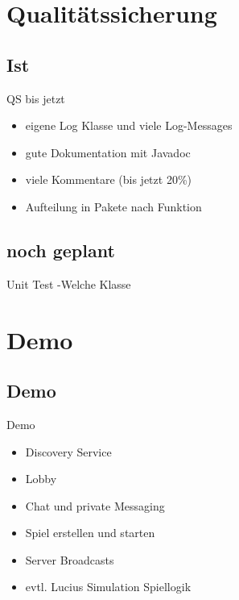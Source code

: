 \documentclass[12pt, utf8]{beamer}
\begin{document}
\section{Qualitätssicherung}
\subsection{Ist}
\begin{frame}{QS bis jetzt}
\begin{itemize}
\item eigene Log Klasse und viele Log-Messages
\item gute Dokumentation mit Javadoc
\item viele Kommentare (bis jetzt 20\%)
\item Aufteilung in Pakete nach Funktion
\end{itemize}
\end{frame}

\subsection{noch geplant}
\begin{frame}
Unit Test
-Welche Klasse
\end{frame}


\section{Demo}
\subsection{Demo}
\begin{frame}{Demo}
\begin{itemize}
\item Discovery Service
\item Lobby
\item Chat und private Messaging
\item Spiel erstellen und starten
\item Server Broadcasts
\item evtl. Lucius Simulation Spiellogik
\end{itemize}
\end{frame}
\end{document}
